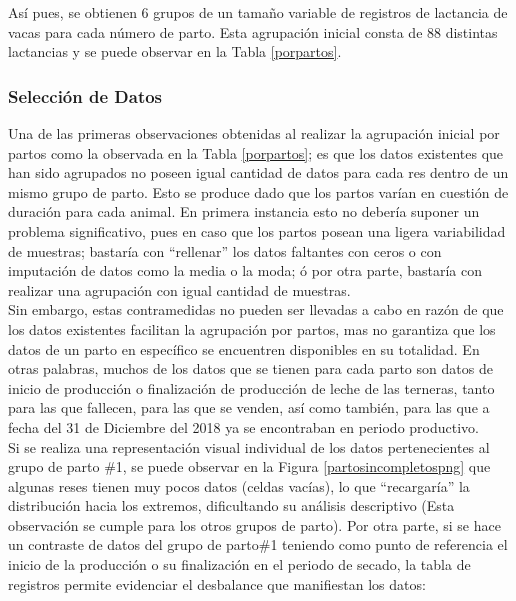 Así pues, se obtienen 6 grupos de un tamaño variable de registros de lactancia de vacas para cada número de parto. Esta agrupación inicial consta de 88 distintas lactancias y se puede observar en la Tabla \ref{porpartos}. %

\subsubsection{Selección de Datos}

Una de las primeras observaciones obtenidas al realizar la agrupación inicial por partos como la observada en la Tabla \ref{porpartos}; es que los datos existentes que han sido agrupados no poseen igual cantidad de datos para cada res dentro de un mismo grupo de parto. Esto se produce dado que los partos varían en cuestión de duración para cada animal. En primera instancia esto no debería suponer un problema significativo, pues en caso que los partos posean una ligera variabilidad de muestras; bastaría con ``rellenar'' los datos faltantes con ceros o con imputación de datos como la media o la moda; ó por otra parte, bastaría con realizar una agrupación con igual cantidad de muestras.\\

Sin embargo, estas contramedidas no pueden ser llevadas a cabo en razón de que los datos existentes facilitan la agrupación por partos, mas no garantiza que los datos de un parto en específico se encuentren disponibles en su totalidad. En otras palabras, muchos de los datos que se tienen para cada parto son datos de inicio de producción o finalización de producción de leche de las terneras, tanto para las que fallecen, para las que se venden, así como también, para las que a fecha del 31 de Diciembre del 2018 ya se encontraban en periodo productivo.\\

Si se realiza una representación visual individual de los datos pertenecientes al grupo de parto \#1, se puede observar en la Figura \ref{partosincompletospng} que algunas reses tienen muy pocos datos (celdas vacías), lo que ``recargaría'' la distribución hacia los extremos, dificultando su análisis descriptivo (Esta observación se cumple para los otros grupos de parto). Por otra parte, si se hace un contraste de datos del grupo de parto\#1 teniendo como punto de referencia el inicio de la producción o su finalización en el periodo de secado, la tabla de registros permite evidenciar el desbalance que manifiestan los datos:

